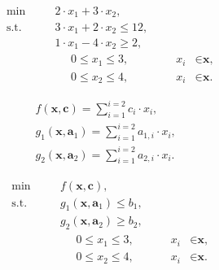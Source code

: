 \begin{figure}[!htbp]
	\renewcommand\figurename{Model}
	\null\hfill
	\begin{subfigure}[b]{0.3\textwidth}
		\begin{subequations}
			\begin{alignat*}{4}
			& \text{min} & & 2 \cdot x_{1} + 3 \cdot x_{2}\textrm{,} &&&\\
			& \text{s.t.} & \quad & 3 \cdot x_{1} + 2 \cdot x_{2} \leqslant 12\textrm{,} &&&\\
			& & \quad & 1 \cdot x_{1} - 4 \cdot x_{2} \geqslant 2\textrm{,} &&&\\
			& & & \phantom{\sum} 0 \leqslant x_{1} \leqslant 3, &\quad & x_{i} &\in \textbf{x}\textrm{,} \\
			& & & \phantom{\sum} 0 \leqslant x_{2} \leqslant 4, &\quad & x_{i} &\in \textbf{x}\textrm{.}
			\end{alignat*}
		\end{subequations}
		\caption{}
		\label{fig:lpexample:a}
	\end{subfigure}
	\hfill
	\begin{subfigure}[b]{0.3\textwidth}
		\begin{gather*}
		f \left( \textbf{x}, \textbf{c} \right) = \sum_{i=1}^{i=2} c_{i} \cdot x_{i}\textrm{,}\\
		g_{1} \left( \textbf{x}, \textbf{a}_{1} \right) = \sum_{i=1}^{i=2} a_{1,i} \cdot x_{i}\textrm{,}\\
		g_{2} \left( \textbf{x}, \textbf{a}_{2} \right) = \sum_{i=1}^{i=2} a_{2,i} \cdot x_{i}\textrm{.}
		\end{gather*}
		\caption{}
		\label{fig:lpexample:b}
	\end{subfigure}
	\hfill
	\begin{subfigure}[b]{0.3\textwidth}
		\begin{subequations}
			\begin{alignat*}{4}
			& \text{min} & & f \left( \textbf{x}, \textbf{c} \right)\textrm{,} &&&\\
			& \text{s.t.} & \quad & g_{1} \left( \textbf{x}, \textbf{a}_{1} \right) \leqslant b_{1}\textrm{,} &&&\\
			& & \quad & g_{2} \left( \textbf{x}, \textbf{a}_{2} \right) \geqslant b_{2}\textrm{,} &&&\\
			& & & \phantom{\sum} 0 \leqslant x_{1} \leqslant 3, &\quad & x_{i} &\in \textbf{x}\textrm{,} \\
			& & & \phantom{\sum} 0 \leqslant x_{2} \leqslant 4, &\quad & x_{i} &\in \textbf{x}\textrm{.}

\end{alignat*}
\end{subequations}
\end{subfigure}
\end{figure}
